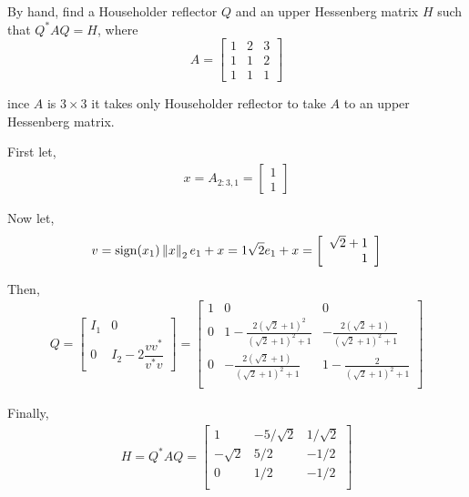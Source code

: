 \documentclass[10pt]{article}
\begin{document}
\begin{problem}[Exercise 6]
By hand, find a Householder reflector \(Q\) and an upper Hessenberg matrix \(H\) such that \(Q^{*} A Q = H\), where
\[ A = \left[ \begin{array}{ccc} 1 & 2 & 3 \\ 1 & 1 & 2 \\ 1 & 1 & 1 \end{array} \right]  \]
\end{problem}

\begin{solution}[Solution]
ince \( A \) is \( 3\times 3 \) it takes only Householder reflector to take \( A \) to an upper Hessenberg matrix.

First let,
\begin{align*}
    x = A_{2:3,1} = \left[\begin{array}{r}1\\1\end{array}\right]
\end{align*}

Now let,
\begin{align*}
    v = \operatorname{sign}(x_1)\left\lVert x\right\rVert_2 e_1+x = 1 \sqrt{2} e_1 + x = \left[\begin{array}{r} \sqrt{2}+1\\1\end{array}\right]
\end{align*}

Then,
\begin{align*}
    Q = \left[\begin{array}{rr}I_1 & 0 \\ 0 & I_2-2\dfrac{vv^*}{v^*v} \end{array}\right] 
        = \left[
\begin{array}{rrr}
 1 & 0 & 0 \\
 0 & 1-\frac{2 \left(\sqrt{2}+1\right)^2}{\left(\sqrt{2}+1\right)^2+1} & -\frac{2 \left(\sqrt{2}+1\right)}{\left(\sqrt{2}+1\right)^2+1} \\
 0 & -\frac{2 \left(\sqrt{2}+1\right)}{\left(\sqrt{2}+1\right)^2+1} & 1-\frac{2}{\left(\sqrt{2}+1\right)^2+1} \\
\end{array}
    \right]
\end{align*}

Finally,
\begin{align*}
    H=Q^*AQ = 
    \left[
        \begin{array}{rrr}
 1 & -5/\sqrt{2} & 1/\sqrt{2} \\
 -\sqrt{2} & 5/2 & -1/2 \\
 0 & 1/2 & -1/2 \\
\end{array}
    \right]
\end{align*}
\end{solution}
\end{document}
